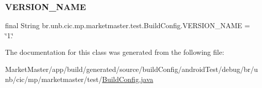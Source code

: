 \subsubsection{\texorpdfstring{V\+E\+R\+S\+I\+O\+N\+\_\+\+N\+A\+ME}{VERSION\_NAME}}
{\footnotesize\ttfamily final String br.\+unb.\+cic.\+mp.\+marketmaster.\+test.\+Build\+Config.\+V\+E\+R\+S\+I\+O\+N\+\_\+\+N\+A\+ME = \char`\"{}1.\char`\"{}\hspace{0.3cm}{\ttfamily [static]}}



The documentation for this class was generated from the following file\+:\begin{DoxyCompactItemize}
\item 
Market\+Master/app/build/generated/source/build\+Config/android\+Test/debug/br/unb/cic/mp/marketmaster/test/\mbox{\hyperlink{androidTest_2debug_2br_2unb_2cic_2mp_2marketmaster_2test_2BuildConfig_8java}{Build\+Config.\+java}}\end{DoxyCompactItemize}
